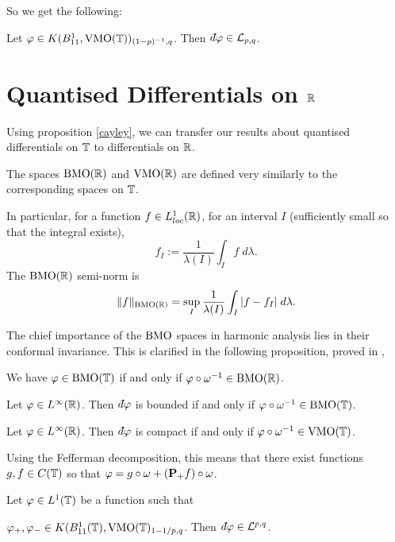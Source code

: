 So we get the following:
\begin{corollary}
    Let $\varphi\in K(B_{11}^1,\operatorname{VMO}(\mathbb{T}))_{(1-p)^{-1},q}$. Then $\qd \varphi \in \mathcal{L}_{p,q}$. 
\end{corollary}

\section{Quantised Differentials on $\mathbb{R}$}
Using proposition \ref{cayley}, we can transfer our results
about quantised differentials on $\mathbb{T}$ to differentials on $\mathbb{R}$.

\begin{definition}
    The spaces $\operatorname{BMO}(\mathbb{R})$ and $\operatorname{VMO}(\mathbb{R})$ are defined
    very similarly to the corresponding spaces on $\mathbb{T}$. 
    
    In particular, for a function $f \in L^1_{loc}(\mathbb{R})$, for
    an interval $I$ (sufficiently small so that the integral exists),
    \begin{equation}
        f_I := \frac{1}{\lambda(I)}\int_I f\;d\lambda.
    \end{equation}
    The $\operatorname{BMO}(\mathbb{R})$ semi-norm is
    \begin{equation}
        \|f\|_{\operatorname{BMO}(\mathbb{R})} = \sup_{I} \frac{1}{\lambda(I)}\int_I |f-f_I|\;d\lambda.
    \end{equation}
\end{definition}

The chief importance of the $\operatorname{BMO}$ spaces in harmonic analysis
lies in their conformal invariance. This is clarified in the following proposition,
proved in \cite[Cor 1.3, p.129]{Garnett},
\begin{proposition}
    We have $\varphi \in \operatorname{BMO}(\mathbb{T})$ if and only if $\varphi \circ \omega^{-1} \in \operatorname{BMO}(\mathbb{R})$.
\end{proposition}

\begin{proposition}
    Let $\varphi \in L^\infty(\mathbb{R})$. Then $\qd \varphi$
    is bounded if and only if $\varphi \circ \omega^{-1} \in \operatorname{BMO}(\mathbb{T})$.
\end{proposition}
\begin{proposition}
    Let $\varphi \in L^\infty(\mathbb{R})$. Then $\qd \varphi$ is compact
    if and only if $\varphi \circ \omega^{-1} \in \operatorname{VMO}(\mathbb{T})$.
    
    Using the Fefferman decomposition, this means that 
    there exist functions $g,f \in C(\mathbb{T})$ so that
    $\varphi = g\circ\omega + (\mathbf{P}_+f)\circ \omega$. 
\end{proposition}

\begin{proposition}
    Let $\varphi\in L^1(\mathbb{T})$ be a function such that
    
    $\varphi_+,\varphi_- \in K(B_{11}^1(\mathbb{T}),\operatorname{VMO}(\mathbb{T})_{1-1/p,q}$. Then $\qd \varphi \in \mathcal{L}^{p,q}$.
\end{proposition}

